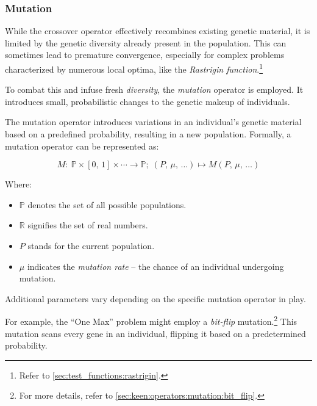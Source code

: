 \subsubsection{Mutation}
\label{sec:bg:ga:var:mut}
  While the crossover operator effectively recombines existing genetic 
  material, it is limited by the genetic diversity already present in the 
  population.
  This can sometimes lead to premature convergence, especially for complex 
  problems characterized by numerous local optima, like the \emph{Rastrigin function}.\footnote{Refer to \vref{sec:test_functions:rastrigin}.}

  To combat this and infuse fresh \textit{diversity}, the \textit{mutation} 
  operator is employed.
  It introduces small, probabilistic changes to the genetic makeup of 
  individuals.

  \begin{definition}
  \label{def:mutation_operator}
    The mutation operator introduces variations in an individual's genetic 
    material based on a predefined probability, resulting in a new population. 
    Formally, a mutation operator can be represented as:

    \[ 
      M :\: \mathbb{P} \times [0,\, 1] \times \cdots \to \mathbb{P};\; 
      (P,\, \mu,\, \dots) \mapsto M(P,\, \mu,\, \dots) 
    \]

    Where:

    \begin{itemize}
      \item \(\mathbb{P}\) denotes the set of all possible populations.
      \item \(\mathbb{R}\) signifies the set of real numbers.
      \item \(P\) stands for the current population.
      \item \(\mu\) indicates the \textit{mutation rate} -- the chance of an 
        individual undergoing mutation.
    \end{itemize}

    Additional parameters vary depending on the specific mutation operator in   
    play.
  \end{definition}

  For example, the \enquote{One Max} problem might employ a \emph{bit-flip} 
  mutation.\footnote{
    For more details, refer to \vref{sec:keen:operators:mutation:bit_flip}.
  }
  This mutation scans every gene in an individual, flipping it based on a 
  predetermined probability.

